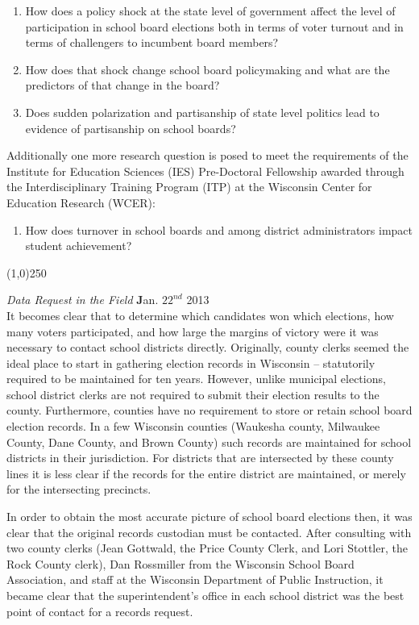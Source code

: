 \begin{enumerate}
\item How does a policy shock at the state level of government affect the level of participation 
in school board elections both in terms of voter turnout and in terms of challengers to 
incumbent board members?
\item How does that shock change school board policymaking and what are the predictors 
of that change in the board?
\item Does sudden polarization and partisanship of state level politics lead to evidence 
of partisanship on school boards?
\end{enumerate}

Additionally one more research question is posed to meet the requirements of the 
Institute for Education Sciences (IES) Pre-Doctoral Fellowship awarded through 
the Interdisciplinary Training Program (ITP) at the Wisconsin Center for Education 
Research (WCER):

\begin{enumerate}
\item How does turnover in school boards and among district administrators impact 
student achievement?
\end{enumerate}


\begin{center}
\line(1,0){250}
\end{center}

{\em Data Request in the Field} \hfill {\textbf Jan. $22^{nd}$ 2013}\\
It becomes clear that to determine which candidates won which elections, how many 
voters participated, and how large the margins of victory were it was necessary 
to contact school districts directly. Originally, county clerks seemed the ideal 
place to start in gathering election records in Wisconsin -- statutorily required 
to be maintained for ten years. However, unlike municipal elections, school district 
clerks are not required to submit their 
election results to the county. Furthermore, counties have no requirement to store or 
retain school board election records. In a few Wisconsin counties (Waukesha county, 
Milwaukee County, Dane County, and Brown County) such records are maintained for school 
districts in their jurisdiction. For districts that are intersected by these county 
lines it is less clear if the records for the entire district are maintained, or merely
for the intersecting precincts. 

In order to obtain the most accurate picture of school board elections then, it was 
clear that the original records custodian must be contacted. After consulting with two 
county clerks (Jean Gottwald, the Price County Clerk, and Lori Stottler, the Rock County 
clerk), Dan Rossmiller from the Wisconsin School Board Association, and staff at the 
Wisconsin Department of Public Instruction, it became clear that the superintendent's 
office in each school district was the best point of contact for a records request.

